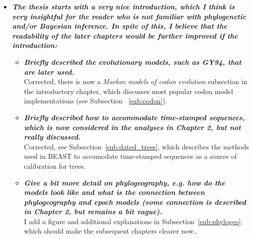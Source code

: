 \documentclass[english]{article}
\begin{document}
\begin{itemize}

\item {
{\it
\textbf{
The thesis starts with a very nice introduction, which I think is very insightful for the reader who is not familiar with phylogenetic and/or Bayesian inference. 
In spite of this, I believe that the readability of the later chapters would be further improved if the introduction:
}%
}%
}%

\begin{itemize}

\item {
{\it
\textbf{
Briefly described the evolutionary models, such as GY94, that are later used.
}%
}%
}%
\\
Corrected, there is now a \emph{Markov models of codon evolution} subsection in the introductory chapter, which discusses most popular codon model implementations (see Subsection ~\ref{sub:codon}).


\item {
{\it
\textbf{
Briefly described how to accommodate time-stamped sequences, which is now considered in the analyses in Chapter 2, but not really discussed.
}%
}%
}%
\\
Corrected, see Subsection~\ref{sub:dated_trees}, which describes the methods used in BEAST to accomodate time-stamped sequences as a source of calibration for trees.




\item {
{\it
\textbf{
Give a bit more detail on phylogeography, e.g. how do the models look like and what is the connection between phylogeography and epoch models (some connection is described in Chapter 2, but remains a bit vague).
}%
}%
}%
\\
I add a figure and additional explanations in Subsection~\ref{sub:phylogeo}, which should make the subsequent chapters clearer now.. 

\end{itemize}


\end{itemize}
\end{document}
